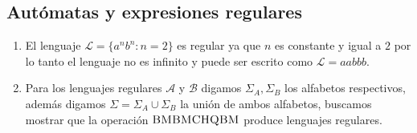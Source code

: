 \documentclass[spanish, fleqn]{article}
\begin{document}
	\subsection*{Autómatas y expresiones regulares}
		\begin{enumerate}
			\item
				El lenguaje $\mathscr{L} = \{a^nb^n: n = 2\}$ es regular ya que
				$n$ es constante y igual a $2$ por lo tanto el lenguaje no es
				infinito y puede ser escrito como $\mathscr{L} = aabbb$.

			\item
				Para los lenguajes regulares $\mathscr{A}$ y $\mathscr{B}$
				digamos $\Sigma_A, \Sigma_B$ los alfabetos respectivos, además
				digamos $\Sigma = \Sigma_A \cup \Sigma_B$ la unión de ambos
				alfabetos, buscamos mostrar que la operación 
				$\textsc{BMBMCHQBM}$ produce lenguajes regulares.


\end{enumerate}
\end{document}

